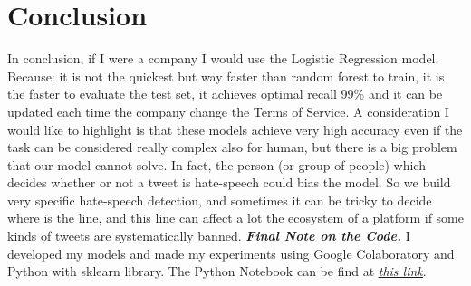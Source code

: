 \documentclass[12pt]{article}
\begin{document}
\section{Conclusion}
In conclusion, if I were a company I would use the Logistic Regression model. Because: it is not the quickest but way faster than random forest to train, it is the faster to evaluate the test set, it achieves optimal recall 99\% and it can be updated each time the company change the Terms of Service.
A consideration I would like to highlight is that these models achieve very high accuracy even if the task can be considered really complex also for human, but there is a big problem that our model cannot solve. In fact, the person (or group of people) which decides whether or not a tweet is hate-speech could bias the model. So we build very specific hate-speech detection, and sometimes it can be tricky to decide where is the line, and this line can affect a lot the ecosystem of a platform if some kinds of tweets are systematically banned. 
\newline
\textbf{\textit{{Final Note on the Code.}}}
I developed my models and made my experiments using Google Colaboratory and Python with  sklearn library.
The Python Notebook can be find at \href{https://github.com/SimoneDutto/Hate-Speech-TwitterBot}{\underline{\textit{this link}}}. 
\newpage
\end{document}
